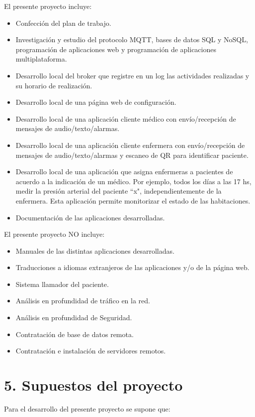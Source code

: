 \documentclass[
11pt, %
]{charter}
\begin{document}
El presente proyecto incluye:

\begin{itemize}
	\item Confección del plan de trabajo. 
	\item Investigación y estudio del protocolo MQTT, bases de datos SQL y NoSQL, programación de aplicaciones web y programación de aplicaciones multiplataforma.	
	\item Desarrollo local del broker que registre en un log las actividades realizadas y su horario de realización. 
	\item Desarrollo local de una página web de configuración.
	\item Desarrollo local de una aplicación cliente médico con envío/recepción de mensajes de audio/texto/alarmas.
	\item Desarrollo local de una aplicación cliente enfermera con envío/recepción de mensajes de audio/texto/alarmas y escaneo de QR para identificar paciente. 
	\item Desarrollo local de una aplicación que asigna enfermeras a pacientes de acuerdo a la indicación de un médico. Por ejemplo, todos los días a las 17 hs, medir la presión arterial del paciente ``x", independientemente de la enfermera. Esta aplicación permite monitorizar el estado de las habitaciones.
	\item Documentación de las aplicaciones desarrolladas.

\end{itemize}

El presente proyecto NO incluye:
\begin{itemize}
	\item Manuales de las distintas aplicaciones desarrolladas.
	\item Traducciones a idiomas extranjeros de las aplicaciones y/o de la página web.
	\item Sistema llamador del paciente.
	\item Análisis en profundidad de tráfico en la red.
	\item Análisis en profundidad de Seguridad.
	\item Contratación de base de datos remota.
	\item Contratación e instalación de servidores remotos.
\end{itemize}



\section{5. Supuestos del proyecto}
\label{sec:supuestos}
Para el desarrollo del presente proyecto se supone que: 
\end{document}
